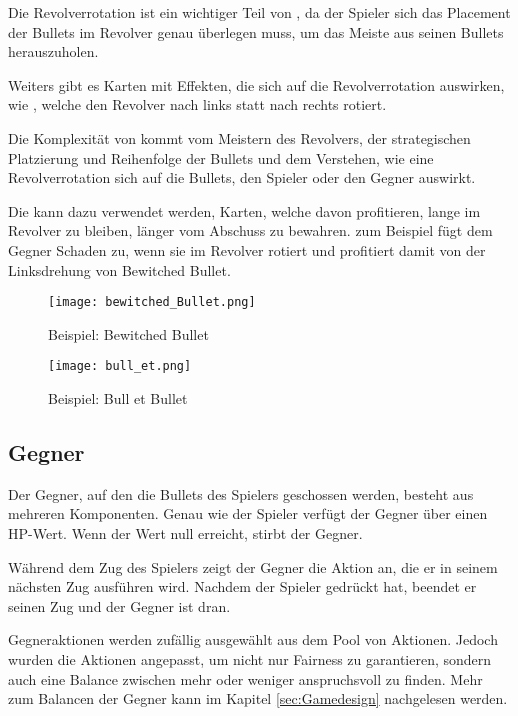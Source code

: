 Die Revolverrotation ist ein wichtiger Teil von \FF, da der Spieler sich das Placement der Bullets im Revolver genau überlegen muss,
um das Meiste aus seinen Bullets herauszuholen.


Weiters gibt es Karten mit Effekten, die sich auf die Revolverrotation auswirken, wie \zB {},
welche den Revolver nach links statt nach rechts rotiert.


Die Komplexität von \FF kommt vom Meistern des Revolvers, der strategischen Platzierung und Reihenfolge der Bullets und dem Verstehen,
wie eine Revolverrotation sich auf die Bullets, den Spieler oder den Gegner auswirkt.


Die  kann \zB dazu verwendet werden, Karten,
welche davon profitieren, lange im Revolver zu bleiben, länger vom Abschuss zu bewahren.  zum Beispiel fügt dem Gegner Schaden zu,
wenn sie im Revolver rotiert und profitiert damit von der Linksdrehung von Bewitched Bullet.


\begin{figure}[H]
    \centering
    \texttt{[image: bewitched\_Bullet.png]}
    \caption{Beispiel: Bewitched Bullet}
\end{figure}

\begin{figure}[H]
    \centering
    \texttt{[image: bull\_et.png]}
    \caption{Beispiel: Bull et Bullet}
\end{figure}


\subsection{Gegner}\label{gegner}
Der Gegner, auf den die Bullets des Spielers geschossen werden, besteht aus mehreren Komponenten.
Genau wie der Spieler verfügt der Gegner über einen HP-Wert. Wenn der Wert null erreicht, stirbt der Gegner.


Während dem Zug des Spielers zeigt der Gegner die Aktion an, die er in seinem nächsten Zug ausführen wird.
Nachdem der Spieler  gedrückt hat, beendet er seinen Zug und der Gegner ist dran.

Gegneraktionen werden zufällig ausgewählt aus dem Pool von Aktionen.
Jedoch wurden die Aktionen angepasst, um nicht nur Fairness zu garantieren,
sondern auch eine Balance zwischen mehr oder weniger anspruchsvoll zu finden.
Mehr zum Balancen der Gegner kann im Kapitel \ref{sec:Gamedesign} nachgelesen werden.


